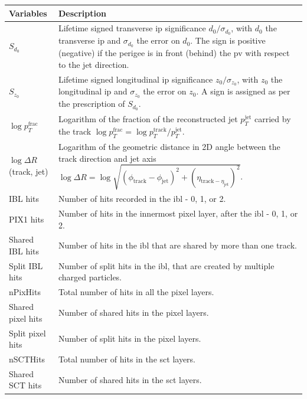 \begin{table}[h]
  \begin{center}
      \begin{tabular}{C{3cm}|C{13cm}} 
      	 \hline \hline
          Variables & Description  \\ \hline
          $S_{d_0}$      & Lifetime signed transverse \gls{ip} significance $d_0 / \sigma_{d_0}$, with $d_0$ the transverse \gls{ip} and $\sigma_{d_0}$ the error on $d_0$. The sign is positive (negative) if the perigee is in front (behind) the \gls{pv} with respect to the jet direction. \\ \hline
          $S_{z_0}$      & Lifetime signed longitudinal \gls{ip} significance $z_0 / \sigma_{z_0}$, with $z_0$ the longitudinal \gls{ip} and $\sigma_{z_0}$ the error on $z_0$. A sign is assigned as per the prescription of $S_{d_0}$. \\ \hline
          $\log p_T^{\textrm{frac}}$   & Logarithm of the fraction of the reconstructed jet $p_T^{\textrm{jet}}$ carried by the track $\log p_T^{\textrm{frac}} = \log p_T^{\textrm{track}} / p_T^{\textrm{jet}}$. \\ \hline
          $\log \Delta R$(track, jet) & Logarithm of the geometric distance in 2D angle between the track direction and jet axis $\log \Delta R = \log \sqrt{(\phi_{\textrm{track}} - \phi_{\textrm{jet}})^2 + (\eta_{\textrm{track} - \eta_{\textrm{jet}}})^2}$. \\ \hline
          IBL hits      & Number of hits recorded in the \gls{ibl} - 0, 1, or 2. \\ \hline
          PIX1 hits       & Number of hits in the innermost pixel layer, after the \gls{ibl} - 0, 1, or 2.  \\ \hline
          Shared IBL hits & Number of hits in the \gls{ibl} that are shared by more than one track. \\ \hline
          Split IBL hits  & Number of split hits in the \gls{ibl}, that are created by multiple charged particles. \\ \hline
          nPixHits        & Total number of hits in all the pixel layers.\\ \hline
          Shared pixel hits & Number of shared hits in the pixel layers.\\ \hline
          Split pixel hits  & Number of split hits in the pixel layers.\\ \hline
          nSCTHits          & Total number of hits in the \gls{sct} layers. \\ \hline
          Shared SCT hits   & Number of shared hits in the \gls{sct} layers.\\ \hline \hline

\end{tabular}
\end{center}
\end{table}
